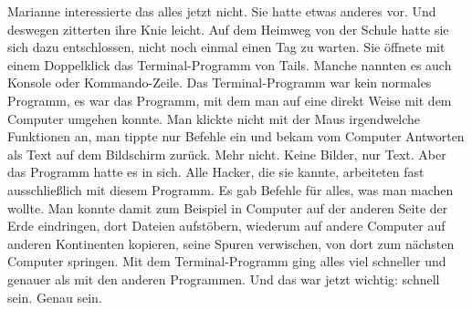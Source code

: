 Marianne interessierte das alles jetzt nicht.
Sie hatte etwas anderes vor.
Und deswegen zitterten ihre Knie leicht.
Auf dem Heimweg von der Schule hatte sie sich dazu entschlossen, nicht noch einmal einen Tag zu warten.
Sie öffnete mit einem Doppelklick das Terminal-Programm von Tails.
Manche nannten es auch Konsole oder Kommando-Zeile.
Das Terminal-Programm war kein normales Programm, es war das Programm, mit dem man auf eine direkt Weise mit dem Computer umgehen konnte.
Man klickte nicht mit der Maus irgendwelche Funktionen an, man tippte nur Befehle ein und bekam vom Computer Antworten als Text auf dem Bildschirm zurück.
Mehr nicht.
Keine Bilder, nur Text.
Aber das Programm hatte es in sich.
Alle Hacker, die sie kannte, arbeiteten fast ausschließlich mit diesem Programm.
Es gab Befehle für alles, was man machen wollte.
Man konnte damit zum Beispiel in Computer auf der anderen Seite der Erde eindringen, dort Dateien aufstöbern, wiederum auf andere Computer auf anderen Kontinenten kopieren, seine Spuren verwischen, von dort zum nächsten Computer springen.
Mit dem Terminal-Programm ging alles viel schneller und genauer als mit den anderen Programmen.
Und das war jetzt wichtig: schnell sein.
Genau sein.
